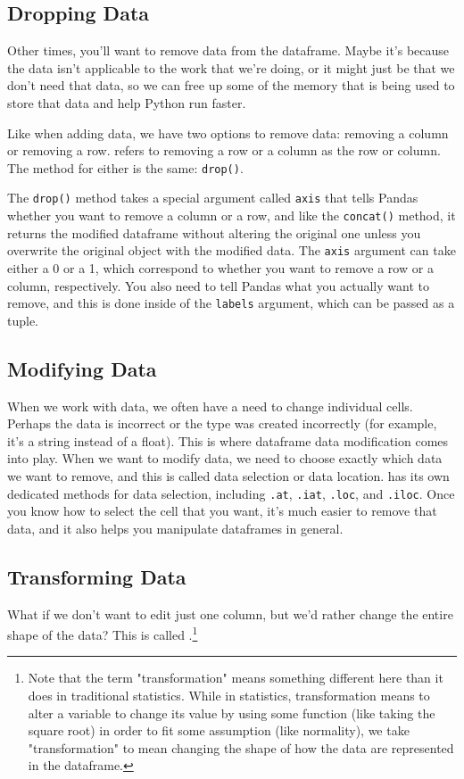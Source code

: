 \subsection{Dropping Data}
Other times, you'll want to remove data from the dataframe. Maybe it's because the data isn't applicable to the work that we're doing, or it might just be that we don't need that data, so we can free up some of the memory that is being used to store that data and help Python run faster.\par
Like when adding data, we have two options to remove data: removing a column or removing a row.  refers to removing a row or a column as  the row or column. The method for either is the same: \verb|drop()|.\par
The \verb|drop()| method takes a special argument called \verb|axis| that tells Pandas whether you want to remove a column or a row, and like the \verb|concat()| method, it returns the modified dataframe without altering the original one unless you overwrite the original object with the modified data. The \verb|axis| argument can take either a 0 or a 1, which correspond to whether you want to remove a row or a column, respectively. You also need to tell Pandas what you actually want to remove, and this is done inside of the \verb|labels| argument, which can be passed as a tuple.\par

\subsection{Modifying Data}
When we work with data, we often have a need to change individual cells. Perhaps the data is incorrect or the type was created incorrectly (for example, it's a string instead of a float). This is where dataframe data modification comes into play. When we want to modify data, we need to choose exactly which data we want to remove, and this is called data selection or data location.  has its own dedicated methods for data selection, including \verb|.at|, \verb|.iat|, \verb|.loc|, and \verb|.iloc|. Once you know how to select the cell that you want, it's much easier to remove that data, and it also helps you manipulate dataframes in general.
\subsection{Transforming Data}
What if we don't want to edit just one column, but we'd rather change the entire shape of the data? This is called .\footnote{Note that the term "transformation" means something different here than it does in traditional statistics. While in statistics, transformation means to alter a variable to change its value by using some function (like taking the square root) in order to fit some assumption (like normality), we take "transformation" to mean changing the shape of how the data are represented in the dataframe.}

